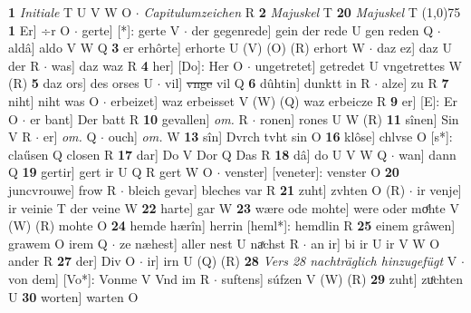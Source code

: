 \documentclass[8pt,a4paper,notitlepage]{article}
\begin{document}
\begin{table}[ht]
\begin{minipage}[t]{0.5\linewidth}
\textbf{1} \textit{Initiale} T U V W O   $\cdot$ \textit{Capitulumzeichen} R  \textbf{2} \textit{Majuskel} T  \textbf{20} \textit{Majuskel} T  \newline
\line(1,0){75} \newline
\textbf{1} Er] ÷r O  $\cdot$ gerte] [*]: gerte V  $\cdot$ der gegenrede] gein der rede U gen reden Q  $\cdot$ aldâ] aldo V W Q \textbf{3} er erhôrte] erhorte U (V) (O) (R) erhort W  $\cdot$ daz ez] daz U der R  $\cdot$ was] daz waz R \textbf{4} her] [Do]: Her O  $\cdot$ ungetretet] getredet U vngetrettes W (R) \textbf{5} daz ors] des orses U  $\cdot$ vil] \sout{vnge} vil Q \textbf{6} dûhtin] dunktt in R  $\cdot$ alze] zu R \textbf{7} niht] niht was O  $\cdot$ erbeizet] waz erbeisset V (W) (Q) waz erbeicze R \textbf{9} er] [E]: Er O  $\cdot$ er bant] Der batt R \textbf{10} gevallen] \textit{om.} R  $\cdot$ ronen] rones U W (R) \textbf{11} sînen] Sin V R  $\cdot$ er] \textit{om.} Q  $\cdot$ ouch] \textit{om.} W \textbf{13} sîn] Dvrch tvht sin O \textbf{16} klôse] chlvse O [s*]: claűsen Q closen R \textbf{17} dar] Do V Dor Q Das R \textbf{18} dâ] do U V W Q  $\cdot$ wan] dann Q \textbf{19} gertir] gert ir U Q R gert W O  $\cdot$ venster] [veneter]: venster O \textbf{20} juncvrouwe] frow R  $\cdot$ bleich gevar] bleches var R \textbf{21} zuht] zvhten O (R)  $\cdot$ ir venje] ir veinie T der veine W \textbf{22} harte] gar W \textbf{23} wære ode mohte] were oder moͤhte V (W) (R) mohte O \textbf{24} hemde hærîn] herrin [heml*]: hemdlin R \textbf{25} einem grâwen] grawem O irem Q  $\cdot$ ze næhest] aller nest U naͯchst R  $\cdot$ an ir] bi ir U ir V W O ander R \textbf{27} der] Div O  $\cdot$ ir] irn U (Q) (R) \textbf{28} \textit{Vers 28 nachträglich hinzugefügt} V   $\cdot$ von dem] [Vo*]: Vonme V Vnd im R  $\cdot$ suftens] súfzen V (W) (R) \textbf{29} zuht] zuͦchten U \textbf{30} worten] warten O \newline
\end{minipage}
\end{table}
\end{document}
